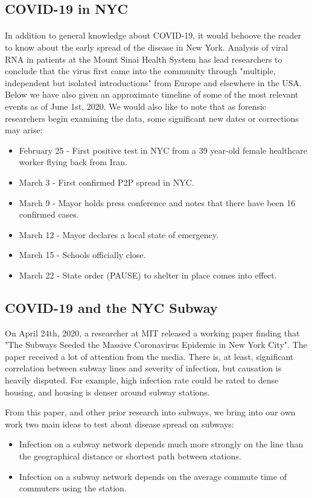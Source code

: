 \documentclass[12pt, a4, epsf] {article}
\theoremstyle{plain}
\theoremstyle{definition}
\begin{document}
\subsection{COVID-19 in NYC}
\paragraph{}
In addition to general knowledge about COVID-19, it would behoove the reader to know about the early spread of the disease in New York. Analysis of viral RNA in patients at the Mount Sinai Health System has lead researchers to conclude that the virus first came into the community through "multiple, independent but isolated introductions" from Europe and elsewhere in the USA\cite{gonzalez_2020}. Below we have also given an approximate timeline of some of the most relevant events as of June 1st, 2020. We would also like to note that as forensic researchers begin examining the data, some significant new dates or corrections may arise:\\ 
\begin{itemize}
	\item February 25 - First positive test in NYC from a 39 year-old female healthcare worker flying back from Iran.
	\item March 3 - First confirmed P2P spread in NYC.
	\item March 9 - Mayor holds press conference and notes that there have been 16 confirmed cases.
	\item March 12 - Mayor declares a local state of emergency.
	\item March 15 - Schools officially close.
	\item March 22 - State order (PAUSE) to shelter in place comes into effect.
\end{itemize}
\subsection{COVID-19 and the NYC Subway}
On April 24th, 2020, a researcher at MIT released a working paper finding that "The Subways Seeded the Massive Coronavirus Epidemic in New York City"\cite{subway_epidemic_seed}. The paper received a lot of attention from the media. There is, at least, significant correlation between subway lines and severity of infection, but causation is heavily disputed. For example, high infection rate could be rated to dense housing, and housing is denser around subway stations. 

From this paper, and other prior research into subways, we bring into our own work two main ideas to test about disease spread on subways:\\
\begin{itemize}
	\item Infection on a subway network depends much more strongly on the line than the geographical distance or shortest path between stations.
	\item Infection on a subway network depends on the average commute time of commuters using the station.
\end{itemize}
\FloatBarrier
\end{document}
